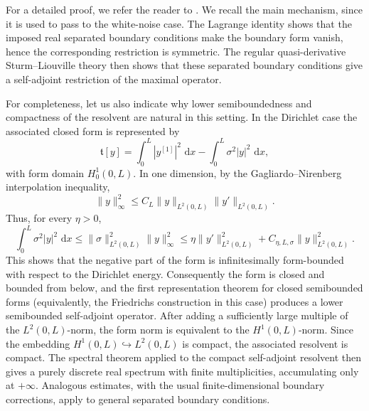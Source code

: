 \documentclass[11pt]{article}
\newcommand{\dd}{\,\mathrm d}
\begin{document}
For a detailed proof, we refer the reader to \cite{SavchukShkalikov}. We recall the main mechanism, since it is used to pass to the white-noise case. The Lagrange identity shows that the imposed real separated boundary conditions make the boundary form vanish, hence the corresponding restriction is symmetric. The regular quasi-derivative Sturm--Liouville theory then shows that these separated boundary conditions give a self-adjoint restriction of the maximal operator.

For completeness, let us also indicate why lower semiboundedness and compactness of the resolvent are natural in this setting. In the Dirichlet case the associated closed form is represented by
\[
    \mathfrak t[y]=\int_0^L |y^{[1]}|^2\,\dd x-\int_0^L \sigma^2|y|^2\,\dd x,
\]
with form domain $H_0^1(0,L)$. In one dimension, by the Gagliardo--Nirenberg interpolation inequality,
\[
    \|y\|_\infty^2\le C_L\|y\|_{L^2(0,L)}\|y'\|_{L^2(0,L)}.
\]
Thus, for every $\eta>0$,
\[
    \int_0^L \sigma^2|y|^2\,\dd x
    \le \|\sigma\|_{L^2(0,L)}^2\|y\|_\infty^2
    \le \eta\|y'\|_{L^2(0,L)}^2+C_{\eta,L,\sigma}\|y\|_{L^2(0,L)}^2.
\]
This shows that the negative part of the form is infinitesimally form-bounded with respect to the Dirichlet energy. Consequently the form is closed and bounded from below, and the first representation theorem for closed semibounded forms (equivalently, the Friedrichs construction in this case) produces a lower semibounded self-adjoint operator. After adding a sufficiently large multiple of the $L^2(0,L)$-norm, the form norm is equivalent to the $H^1(0,L)$-norm. Since the embedding $H^1(0,L)\hookrightarrow L^2(0,L)$ is compact, the associated resolvent is compact. The spectral theorem applied to the compact self-adjoint resolvent then gives a purely discrete real spectrum with finite multiplicities, accumulating only at $+\infty$. Analogous estimates, with the usual finite-dimensional boundary corrections, apply to general separated boundary conditions.
\end{document}
